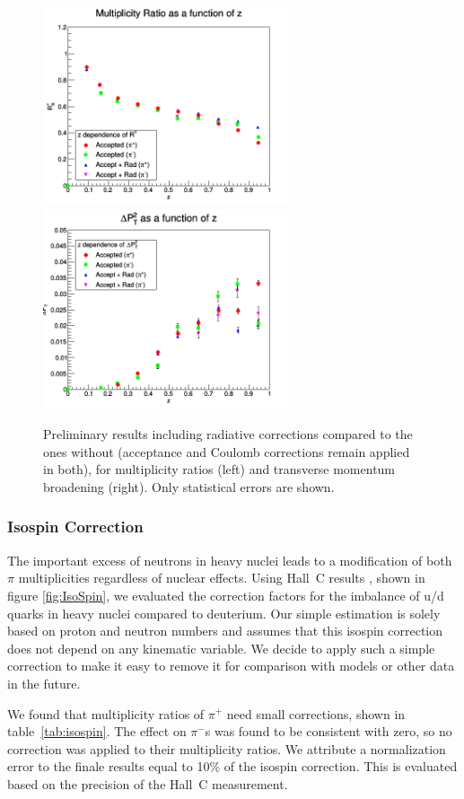 \begin{figure}[p]
\includegraphics[width=7.4cm] {new-fig/62_zdep_Ratio_Zz_3.png} 
\includegraphics[width=7.4cm] {new-fig/67_zdep_DePts_Zz_3.png} 
\caption {Preliminary results including radiative corrections
compared to the ones without (acceptance and Coulomb corrections remain applied in both), 
for multiplicity ratios (left) and transverse momentum broadening 
(right). Only statistical errors are shown.}
\label{fig:RCPlots}
\end{figure}

\subsubsection{Isospin Correction}

The important excess of neutrons in heavy nuclei leads to a modification of 
both $\pi$ multiplicities regardless of nuclear effects. Using Hall~C results 
\cite{Asaturyan:2011mq}, shown in figure \ref{fig:IsoSpin}, we evaluated the 
correction factors for the imbalance of u/d quarks in heavy nuclei compared
to deuterium. Our simple estimation is solely based on proton and neutron 
numbers and assumes that this isospin correction does not depend on any
kinematic variable. We decide to apply such a simple correction to make it easy
to remove it for comparison with models or other data in the future.

We found that multiplicity ratios of $\pi^+$ need small
corrections, shown in table~\ref{tab:isospin}. The effect on $\pi^-$s was 
found to be consistent with zero, so no correction was applied to their 
multiplicity ratios. We attribute a normalization error to the finale results
equal to 10\% of the isospin correction. This is evaluated based on the 
precision of the Hall~C measurement.


